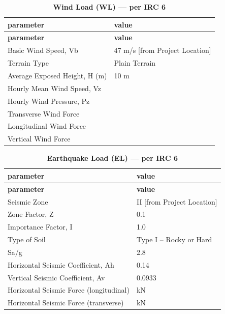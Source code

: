 \documentclass[12pt,a4paper]{report}
\numberwithin{table}{chapter}
\numberwithin{figure}{chapter}
\begin{document}
\vspace{1em}
\begin{longtable}{|L{5.5cm}|p{10.0cm}|}
\caption{\textbf{Wind Load (WL) --- per IRC 6}}
\hline
\textbf{parameter} & \textbf{value} \\
\hline
\endfirsthead

\hline
\textbf{parameter} & \textbf{value} \\
\hline
\endhead
\textnormal{Basic Wind Speed, Vb} & 47 m/s [from Project Location] \\[6pt]
\hline
\textnormal{Terrain Type} & Plain Terrain \\[6pt]
\hline
\textnormal{Average Exposed Height, H (m)} & 10 m \\[6pt]
\hline
\textnormal{Hourly Mean Wind Speed, Vz} &  \\[6pt]
\hline
\textnormal{Hourly Wind Pressure, Pz} &  \\[6pt]
\hline
\textnormal{Transverse Wind Force} &  \\[6pt]
\hline
\textnormal{Longitudinal Wind Force} &  \\[6pt]
\hline
\textnormal{Vertical Wind Force} &  \\[6pt]
\hline
\end{longtable}

\vspace{1em}
\begin{longtable}{|L{5.5cm}|p{10.0cm}|}
\caption{\textbf{Earthquake Load (EL) --- per IRC 6}}
\hline
\textbf{parameter} & \textbf{value} \\
\hline
\endfirsthead

\hline
\textbf{parameter} & \textbf{value} \\
\hline
\endhead
\textnormal{Seismic Zone} & II [from Project Location] \\[6pt]
\hline
\textnormal{Zone Factor, Z} & 0.1 \\[6pt]
\hline
\textnormal{Importance Factor, I} & 1.0 \\[6pt]
\hline
\textnormal{Type of Soil} & Type I – Rocky or Hard \\[6pt]
\hline
\textnormal{Sa/g} & 2.8 \\[6pt]
\hline
\textnormal{Horizontal Seismic Coefficient, Ah} & 0.14 \\[6pt]
\hline
\textnormal{Vertical Seismic Coefficient, Av} & 0.0933 \\[6pt]
\hline
\textnormal{Horizontal Seismic Force (longitudinal)} &  kN \\[6pt]
\hline
\textnormal{Horizontal Seismic Force (transverse)} &  kN \\[6pt]
\hline
\end{longtable}
\end{document}
